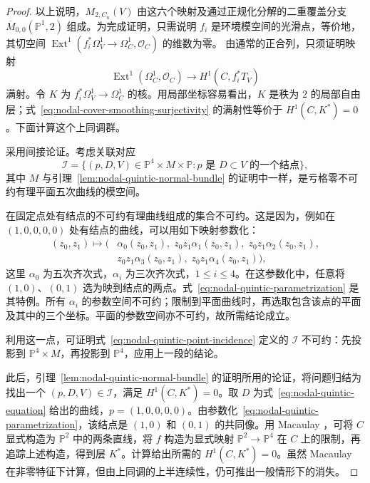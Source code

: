 \begin{proof}
以上说明，$M_{2,C_n}(V)$ 由这六个映射及通过正规化分解的二重覆盖分支 $\overline M_{0,0}(\mathbb P^1,2)$ 组成。为完成证明，只需说明 $f_i$ 是环境模空间的光滑点，等价地，其切空间 $\operatorname{Ext}^1(f_i^*\Omega_V^1\to\Omega_C^1,\mathcal O_C)$ 的维数为零。
由通常的正合列，只须证明映射
\begin{equation}\label{eq:nodal-cover-smoothing-surjectivity}
\operatorname{Ext}^1(\Omega_C^1,\mathcal O_C)\longrightarrow H^1(C,f_i^*T_V)
\end{equation}
满射。令 $K$ 为 $f_i^*\Omega_V^1\to\Omega_C^1$ 的核。用局部坐标容易看出，$K$ 是秩为 $2$ 的局部自由层；式~\eqref{eq:nodal-cover-smoothing-surjectivity} 的满射性等价于 $H^1(C,K^*)=0$。下面计算这个上同调群。

采用间接论证。考虑关联对应
\begin{equation}\label{eq:nodal-quintic-point-incidence}
\mathcal I=\{(p,D,V)\in\mathbb P^4\times M\times\mathbb P:
 p\text{ 是 }D\subset V\text{ 的一个结点}\},
\end{equation}
其中 $M$ 与引理~\ref{lem:nodal-quintic-normal-bundle} 的证明中一样，是亏格零不可约有理平面五次曲线的模空间。

在固定点处有结点的不可约有理曲线组成的集合不可约。这是因为，例如在 $(1,0,0,0,0)$ 处有结点的曲线，可以用如下映射参数化：
\[
\begin{aligned}
(z_0,z_1)\longmapsto\bigl(&\alpha_0(z_0,z_1),\;z_0z_1\alpha_1(z_0,z_1),\;z_0z_1\alpha_2(z_0,z_1),\\
 &z_0z_1\alpha_3(z_0,z_1),\;z_0z_1\alpha_4(z_0,z_1)\bigr),
\end{aligned}
\]
这里 $\alpha_0$ 为五次齐次式，$\alpha_i$ 为三次齐次式，$1\le i\le4$。在这参数化中，任意将 $(1,0)$、$(0,1)$ 选为映到结点的两点。式~\eqref{eq:nodal-quintic-parametrization} 是其特例。所有 $\alpha_i$ 的参数空间不可约；限制到平面曲线时，再选取包含该点的平面及其中的三个坐标。平面的参数空间亦不可约，故所需结论成立。

利用这一点，可证明式~\eqref{eq:nodal-quintic-point-incidence} 定义的 $\mathcal I$ 不可约：先投影到 $\mathbb P^4\times M$，再投影到 $\mathbb P^4$，应用上一段的结论。

此后，引理~\ref{lem:nodal-quintic-normal-bundle} 的证明所用的论证，将问题归结为找出一个 $(p,D,V)\in\mathcal I$，满足 $H^1(C,K^*)=0$。取 $D$ 为式~\eqref{eq:nodal-quintic-equation} 给出的曲线，$p=(1,0,0,0,0)$。由参数化~\eqref{eq:nodal-quintic-parametrization}，该结点是 $(1,0)$ 和 $(0,1)$ 的共同像。用 Macaulay ，可将 $C$ 显式构造为 $\mathbb P^2$ 中的两条直线，将 $f$ 构造为显式映射 $\mathbb P^2\to\mathbb P^4$ 在 $C$ 上的限制，再追踪上述构造，得到层 $K^*$。计算给出所需的 $H^1(C,K^*)=0$。虽然 Macaulay 在非零特征下计算，但由上同调的上半连续性，仍可推出一般情形下的消失。
\end{proof}

